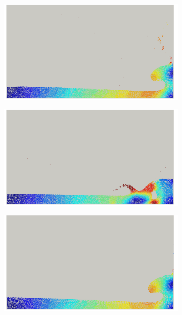 \begin{figure}[H]
	\begin{subfigure}{0.4\columnwidth}    
		\centering
		\includegraphics[width=1.0\textwidth]{images/SPH_Comparison/xsph_1.png}
	\end{subfigure}
	\begin{subfigure}{0.4\columnwidth}
		\centering
		\includegraphics[width=1.0\textwidth]{images/SPH_Comparison/xsph_2.png}
	\end{subfigure}
	\begin{subfigure}{0.4\columnwidth}    
		\centering
		\includegraphics[width=1.0\textwidth]{images/SPH_Comparison/isph_1.png}

\end{subfigure}
\end{figure}
